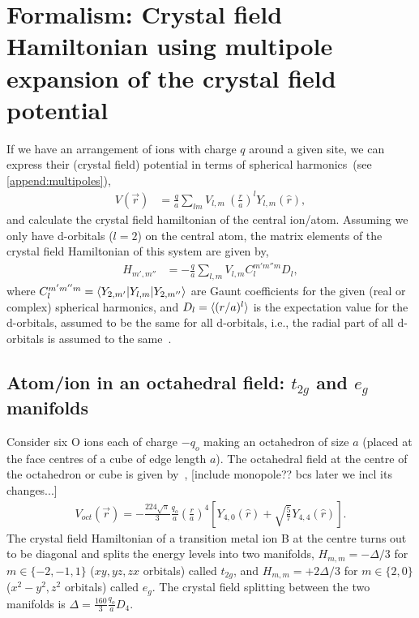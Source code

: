 \documentclass[a4paper,prb]{revtex4-1}  %
\newcommand{\ylm}[1]{Y_{#1}(\hat r)}
\begin{document}
\maketitle




 
\section{Formalism: Crystal field Hamiltonian using multipole expansion of the crystal field potential}

If we have an arrangement of ions with charge $q$ around a given site,
we can express their (crystal field) potential in terms of spherical harmonics~(see \ref{append:multipoles}), 
\begin{align}
V(\vec r) &= \frac{q}{a}\sum_{lm}V_{l,m}~\left(\frac{r}{a}\right)^l \ylm{l,m},
\end{align}
and calculate the crystal field hamiltonian of the central ion/atom.
Assuming we only have d-orbitals ($l=2$) on the central atom,
the matrix elements of the crystal field Hamiltonian of this system 
are given by,
\begin{align}
H_{m',m''} &= -\frac{q}{a}\sum_{l,m} V_{l,m} C_{l}^{m'm''m} D_{l} ,
\end{align}
where 
$C_{l}^{m'm''m}=\braket{Y_{2,m'}| Y_{l,m}| Y_{2,m''}}$ are Gaunt coefficients for the given (real or complex) spherical harmonics,
and $D_{l}=\braket{(r/a)^l}$ is the expectation value for the d-orbitals, assumed to be the same for all d-orbitals, i.e., the radial part of all d-orbitals is assumed to the same~\cite{paxton-notes}.

\subsection{Atom/ion in an octahedral field: $t_{2g}$  and $e_g$ manifolds}
\label{sec:egt2g}
Consider six O ions each of charge $-q_o$ making an octahedron of size $a$ (placed at the face centres of a cube of edge length $a$).
The octahedral field at the centre of the octahedron or cube  
is given by~\cite{pavariniChap}, [include monopole?? bcs later we incl its changes...]
\begin{align}
\label{eq:voct}
V_{oct}(\vec r) = -\frac{224\sqrt{\pi}}{3}\frac{q_o}{a} \left(\frac{r}{a}\right)^4\left[\ylm{4,0}+\sqrt{\frac{5}{7}}\ylm{4,4} \right].
\end{align}
The crystal field Hamiltonian of a transition metal ion B at the centre 
turns out to be diagonal
and splits the energy levels into two manifolds,
$H_{m,m} = -\Delta/3$ for $m\in\{-2,-1,1\}$ ($xy,yz,zx$ orbitals)
called $t_{2g}$,
and 
$H_{m,m} = +2\Delta/3$ for $m\in\{2,0\}$ ($x^2-y^2,z^2$ orbitals)
called $e_g$.
The crystal field splitting between the two manifolds is
${\Delta=\frac{160}{3}\frac{q_o}{a} D_{4}}$.
\end{document}
